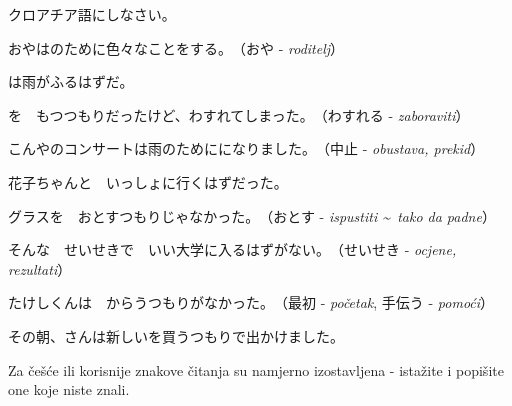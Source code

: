 
\author{Tomislav Mamić}

	
	\begin{mondai}{クロアチア語にしなさい。}
		\itemsep0pt
		\item おやはのために色々なことをする。　（おや - \textit{roditelj}）
		\item {}は雨がふるはずだ。
		\item {}を　もつつもりだったけど、わすれてしまった。　（わすれる - \textit{zaboraviti}）
		\item こんやのコンサートは雨のためにになりました。　（中止 - \textit{obustava, prekid}）
		\item 花子ちゃんと　いっしょに行くはずだった。
		\item グラスを　おとすつもりじゃなかった。　（おとす - \textit{ispustiti \textasciitilde~tako da padne}）
		\item そんな　せいせきで　いい大学に入るはずがない。　（せいせき - \textit{ocjene, rezultati}）
		\item たけしくんは　からうつもりがなかった。　（最初 - \textit{početak}, 手伝う - \textit{pomoći}）
		\item その朝、さんは新しいを買うつもりで出かけました。
	\end{mondai}

	\vspace{10pt}\noindent
	Za češće ili korisnije znakove čitanja su namjerno izostavljena - istažite i popišite one koje niste znali.
